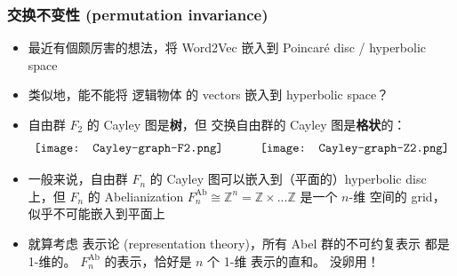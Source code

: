 \documentclass[15pt]{beamer}
\newcommand{\cc}[2]{#1}
\newcommand{\cc}[2]{#2}
\newcommand{\emp}[1]{{\color{violet}#1}}
\newcommand{\red}[1]{{\color{red}#1}}
\begin{document}
\begin{frame}
\frametitle{\cc{交换不变性 (permutation invariance)}{Permutation invariance}}
\begin{itemize}
	
	\item \cc{
	最近有個颇厉害的想法，将 Word2Vec 嵌入到 Poincar\'{e} disc / hyperbolic space \parencite{Nickel2017}}{
	Recently a nice idea has been proposed to embed Word2Vec into Poincar\'{e} disc / hyperbolic space \parencite{Nickel2017}
	}
	
	\item \cc{
	类似地，能不能将 逻辑物体 的 vectors 嵌入到 hyperbolic space？ }{
	Can we similarly embed logic structures (as vectors) into hyperbolic space?
	}
	
	\item \cc{
	自由群 $F_2$ 的 Cayley 图是\textbf{树}，但 \red{交换}自由群的 Cayley 图是\textbf{格状}的： }{
	Cayley graph of the free group $F_2$ is a \emp{tree}, but Cayley graph of the \red{Abelian} free group is \emp{grid}-like:
	}
		\begin{equation}
		\vcenter{\hbox{\texttt{[image: Cayley-graph-F2.png]}}}
		\quad \quad \quad
		\vcenter{\hbox{\texttt{[image: Cayley-graph-Z2.png]}}}
		\end{equation}
		
	\item \cc{
	一般来说，自由群 $F_n$ 的 Cayley 图可以嵌入到（平面的）hyperbolic disc 上，但 $F_n$ 的 Abelianization $F_n^{\text{Ab}} \cong \mathbb{Z}^n = \mathbb{Z} \times ... \mathbb{Z}$ 是一个 \red{$n$-维} 空间的 grid，似乎不可能嵌入到平面上}{
	Generally, the free group $F_n$'s Cayley graph can be embedded into the (planar) hyperbolic disc, but the Abelianization of $F_n = F_n^{\text{Ab}} \cong \mathbb{Z}^n = \mathbb{Z} \times ... \mathbb{Z}$ is a \red{$n$-dimensional} grid, which seems impossible to embed on a plane.
	}
	\item \cc{
	就算考虑 表示论 (representation theory)，所有 Abel 群的不可约复表示 都是 1-维的。 $F_n^{\text{Ab}}$ 的表示，恰好是 $n$ 个 1-维 表示的直和。 没卵用！}{
	Even considering representation theory, all irreducible representations of Abelian groups are 1-dimensional.  The representation of $F_n^{\text{Ab}}$ is precisely the direct sum of $n$ copies of dim-1 representations.  Useless!
	}
	
\end{itemize}
\end{frame}
\end{document}
